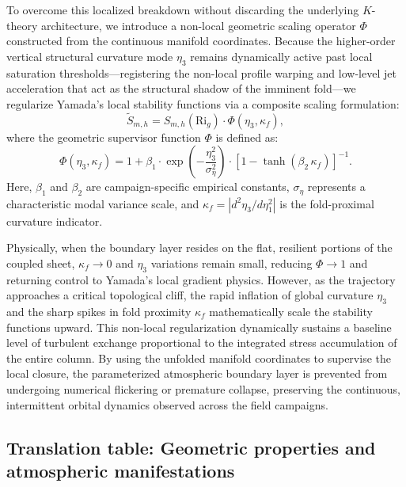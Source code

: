 \documentclass[12pt,a4paper]{article}
\newcommand{\Rig}{\mathrm{Ri}_g}
\begin{document}
To overcome this localized breakdown without discarding the underlying $K$-theory architecture, we introduce a non-local geometric scaling operator $\Phi$ constructed from the continuous manifold coordinates. Because the higher-order vertical structural curvature mode $\eta_3$ remains dynamically active past local saturation thresholds---registering the non-local profile warping and low-level jet acceleration that act as the structural shadow of the imminent fold---we regularize Yamada's local stability functions via a composite scaling formulation:
\begin{equation}
\widetilde{S}_{m,h} = S_{m,h}(\Rig) \cdot \Phi(\eta_3, \kappa_f),
\end{equation}
where the geometric supervisor function $\Phi$ is defined as:
\begin{equation}
\Phi(\eta_3, \kappa_f) = 1 + \beta_1 \cdot \exp\left( -\frac{\eta_3^2}{\sigma_\eta^2} \right) \cdot \left[ 1 - \tanh\left( \beta_2 \, \kappa_f \right) \right]^{-1}.
\end{equation}
Here, $\beta_1$ and $\beta_2$ are campaign-specific empirical constants, $\sigma_\eta$ represents a characteristic modal variance scale, and $\kappa_f = |d^2\eta_3/d\eta_1^2|$ is the fold-proximal curvature indicator.

Physically, when the boundary layer resides on the flat, resilient portions of the coupled sheet, $\kappa_f \to 0$ and $\eta_3$ variations remain small, reducing $\Phi \to 1$ and returning control to Yamada's local gradient physics. However, as the trajectory approaches a critical topological cliff, the rapid inflation of global curvature $\eta_3$ and the sharp spikes in fold proximity $\kappa_f$ mathematically scale the stability functions upward. This non-local regularization dynamically sustains a baseline level of turbulent exchange proportional to the integrated stress accumulation of the entire column. By using the unfolded manifold coordinates to supervise the local closure, the parameterized atmospheric boundary layer is prevented from undergoing numerical flickering or premature collapse, preserving the continuous, intermittent orbital dynamics observed across the field campaigns.

\subsection{Translation table: Geometric properties and atmospheric manifestations}
\end{document}
